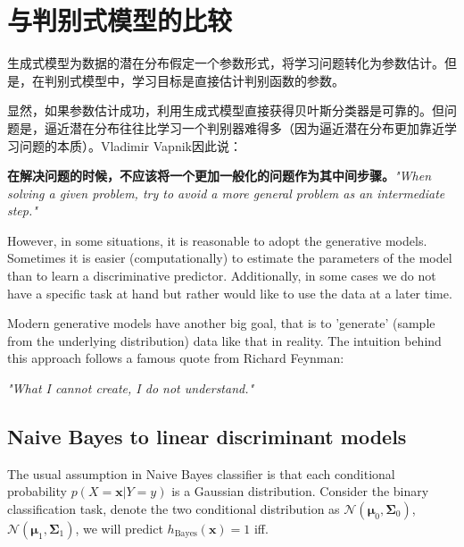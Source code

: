 \documentclass{article}
\begin{document}
		
\section{与判别式模型的比较}
	\label{sec:final}
	生成式模型为数据的潜在分布假定一个参数形式，将学习问题转化为参数估计。但是，在判别式模型中，学习目标是直接估计判别函数的参数。
	
	显然，如果参数估计成功，利用生成式模型直接获得贝叶斯分类器是可靠的。但问题是，逼近潜在分布往往比学习一个判别器难得多（因为逼近潜在分布更加靠近学习问题的本质）。Vladimir Vapnik因此说：
	\begin{center}
	\textbf{在解决问题的时候，不应该将一个更加一般化的问题作为其中间步骤。}\textit{"When solving a given problem, try to avoid a more general problem as an intermediate step."}
	\end{center}

	However, in some situations, it is reasonable to adopt the generative models. Sometimes it is easier (computationally) to estimate the parameters of the model than to learn a discriminative predictor. Additionally, in some cases we do not have a specific task at hand but rather would like to use the data at a later time.
	
	Modern generative models have another big goal, that is to 'generate' (sample from the underlying distribution) data like that in reality. The intuition behind this approach follows a famous quote from Richard Feynman:	
	\begin{center}
	\textit{"What I cannot create, I do not understand."}
	\end{center}

	\subsection{Naive Bayes to linear discriminant models}
	The usual assumption in Naive Bayes classifier is that each conditional probability $p(X=\bm{x}|Y=y)$ is a Gaussian distribution. Consider the binary classification task, denote the two conditional distribution as $\mathcal{N}(\bm{\mu}_0,\bm{\Sigma}_0)$, $\mathcal{N}(\bm{\mu}_1,\bm{\Sigma}_1)$, we will predict $h_{\mathrm{Bayes}}(\bm{x})=1$ iff.
	
\end{document}
